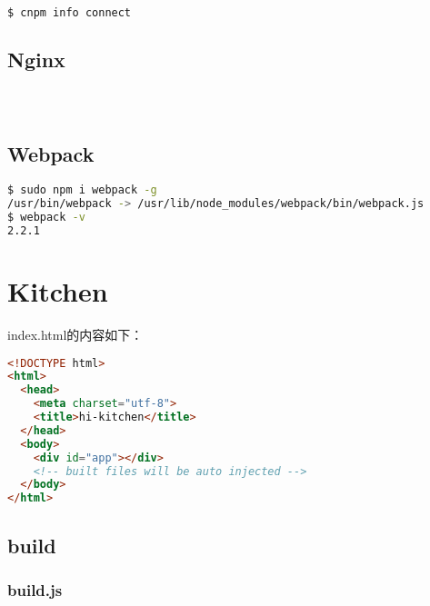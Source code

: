 \begin{lstlisting}[language=bash]
$ cnpm info connect
\end{lstlisting}


\section{Nginx}




\begin{lstlisting}[language=bash]

\end{lstlisting}


\begin{lstlisting}[language=bash]

\end{lstlisting}


\begin{lstlisting}[language=bash]

\end{lstlisting}

\section{Webpack}


\begin{lstlisting}[language=bash]
$ sudo npm i webpack -g
/usr/bin/webpack -> /usr/lib/node_modules/webpack/bin/webpack.js
$ webpack -v
2.2.1
\end{lstlisting}

\chapter{Kitchen}

index.html的内容如下：


\begin{lstlisting}[language=HTML]
<!DOCTYPE html>
<html>
  <head>
    <meta charset="utf-8">
    <title>hi-kitchen</title>
  </head>
  <body>
    <div id="app"></div>
    <!-- built files will be auto injected -->
  </body>
</html>
\end{lstlisting}


\section{build}


\subsection{build.js}


